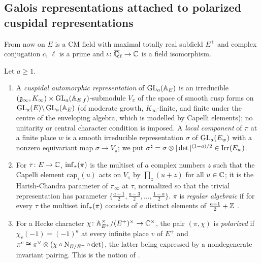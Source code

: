 \subsection{Galois representations attached to polarized cuspidal representations}\label{sec:galois:row}

From now on $E$ is a CM field with maximal totally real subfield $E^+$ and complex conjugation $c$,
$\ell$ is a prime and $\iota\colon\overline{\mathbb{Q}}_\ell\to\mathbb{C}$ is a field isomorphism.

\begin{definition}\label{def:galois:aut}
Let $a\ge1$.
\begin{enumerate}[label=(\alph*),nosep]
\item A \emph{cuspidal automorphic representation} of $\operatorname{GL}_a(\mathbb{A}_E)$ is an irreducible
  $(\mathfrak g_\infty,K_\infty)\times\operatorname{GL}_a(\mathbb{A}_{E,f})$-submodule $V_\pi$ of the space of smooth cusp forms
  on $\operatorname{GL}_a(E)\backslash\operatorname{GL}_a(\mathbb{A}_E)$ (of moderate growth, $K_\infty$-finite, and finite under the
  centre of the enveloping algebra, which is modelled by Capelli elements); no unitarity or central
  character condition is imposed. A \emph{local component} of $\pi$ at a finite place $w$ is a smooth
  irreducible representation $\sigma$ of $\operatorname{GL}_a(E_w)$ with a nonzero equivariant map $\sigma\to V_\pi$;
  we put $\sigma^\natural=\sigma\otimes|\det|^{(1-a)/2}\in\operatorname{Irr}(E_w)$.
\item For $\tau\colon E\to\mathbb{C}$, $\operatorname{inf}_\tau(\pi)$ is the multiset of $a$ complex numbers $z$ such
  that the Capelli element $\mathrm{cap}_\tau(u)$ acts on $V_\pi$ by $\prod_z(u+z)$ for all $u\in\mathbb{C}$; it
  is the Harish-Chandra parameter of $\pi_\infty$ at $\tau$, normalized so that the trivial
  representation has parameter $\{\frac{a-1}2,\frac{a-3}2,\dots,\frac{1-a}2\}$. $\pi$ is \emph{regular
  algebraic} if for every $\tau$ the multiset $\operatorname{inf}_\tau(\pi)$ consists of $a$ distinct elements
  of $\frac{a-1}2+\mathbb{Z}$ \cite{Clozel1990}.
\item For a Hecke character $\chi\colon\mathbb{A}_{E^+}^\times/(E^+)^\times\to\mathbb{C}^\times$, the pair $(\pi,\chi)$ is
  \emph{polarized} if $\chi_v(-1)=(-1)^a$ at every infinite place $v$ of $E^+$ and
  $\pi^c\cong\pi^\vee\otimes(\chi\circ\operatorname{N}_{E/E^+}\circ\det)$, the latter being expressed by a
  nondegenerate invariant pairing. This is the notion of \cite[\S2.1]{BarnetLambEtAl2014}.
\end{enumerate}
\end{definition}

